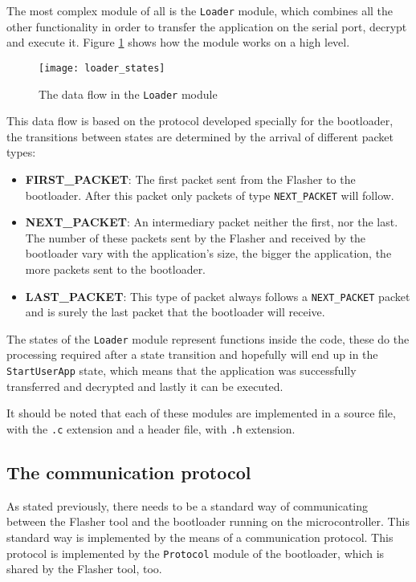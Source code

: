 \documentclass[10pt,a4paper,twoside]{article}
\begin{document}
The most complex module of all is the \texttt{Loader} module, which combines all the other functionality in order to transfer the application on the serial port, decrypt and execute it. Figure \ref{loaderStates} shows how the module works on a high level.

\begin{figure}[H]
    \centering
    \texttt{[image: loader\_states]}
    \caption{The data flow in the \texttt{Loader} module}
    \label{loaderStates}
\end{figure}

This data flow is based on the protocol developed specially for the bootloader, the transitions between states are determined by the arrival of different packet types:

\begin{itemize}
\item \textbf{FIRST\_PACKET}: The first packet sent from the Flasher to the bootloader. After this packet only packets of type \texttt{NEXT\_PACKET} will follow.
\item \textbf{NEXT\_PACKET}: An intermediary packet neither the first, nor the last. The number of these packets sent by the Flasher and received by the bootloader vary with the application's size, the bigger the application, the more packets sent to the bootloader.
\item \textbf{LAST\_PACKET}: This type of packet always follows a \texttt{NEXT\_PACKET} packet and is surely the last packet that the bootloader will receive.
\end{itemize}

The states of the \texttt{Loader} module represent functions inside the code, these do the processing required after a state transition and hopefully will end up in the \texttt{StartUserApp} state, which means that the application was successfully transferred and decrypted and lastly it can be executed.

It should be noted that each of these modules are implemented in a source file, with the \texttt{.c} extension and a header file, with \texttt{.h} extension.

\subsection{The communication protocol}
As stated previously, there needs to be a standard way of communicating between the Flasher tool and the bootloader running on the microcontroller. This standard way is implemented by the means of a communication protocol. This protocol is implemented by the \texttt{Protocol} module of the bootloader, which is shared by the Flasher tool, too.
\end{document}
